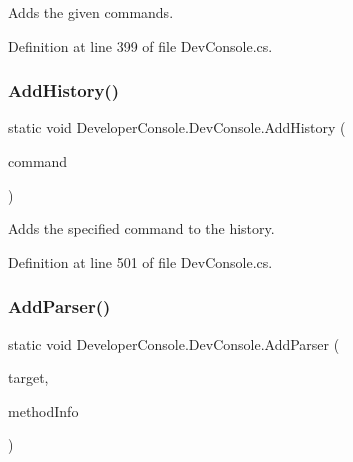 Adds the given commands. 



Definition at line 399 of file Dev\+Console.\+cs.

\mbox{\label{class_developer_console_1_1_dev_console_a08b3c37a06bcfbf5a0b82e7cd05a1034}} 
\subsubsection{\texorpdfstring{Add\+History()}{AddHistory()}}
{\footnotesize\ttfamily static void Developer\+Console.\+Dev\+Console.\+Add\+History (\begin{DoxyParamCaption}\item[{string}]{command }\end{DoxyParamCaption})\hspace{0.3cm}{\ttfamily [static]}}



Adds the specified command to the history. 



Definition at line 501 of file Dev\+Console.\+cs.

\mbox{\label{class_developer_console_1_1_dev_console_a46515b54112416427bb3bc5426b4a15f}} 
\subsubsection{\texorpdfstring{Add\+Parser()}{AddParser()}\hspace{0.1cm}{\footnotesize\ttfamily [1/3]}}
{\footnotesize\ttfamily static void Developer\+Console.\+Dev\+Console.\+Add\+Parser (\begin{DoxyParamCaption}\item[{Type}]{target,  }\item[{Method\+Info}]{method\+Info }\end{DoxyParamCaption})\hspace{0.3cm}{\ttfamily [static]}}




